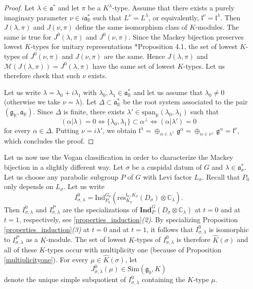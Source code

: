\documentclass{amsart}
\theoremstyle{definition}
\begin{document}
\begin{proof}
    Let $\lambda \in \mathfrak{a}^*$ and let $\pi$ be a $K^\lambda$-type. Assume that there exists a purely imaginary parameter $\nu \in i\mathfrak{a}^*_\mathbb{R}$ such that $L^\nu = L^\lambda$, or equivalently, $\mathfrak{l}^\nu = \mathfrak{l}^\lambda$. Then $J(\lambda,\pi)$ and $J(\nu, \pi)$ define the same isomorphism class of $K$-modules. The same is true for $J^0(\lambda,\pi)$ and $J^0(\nu, \pi)$.
    Since the Mackey bijection preserves lowest $K$-types for unitary representations \cite{Afgoustidis1}*{Proposition 4.1}, the set of lowest $K$-types of $J^0(\nu, \pi)$ and $J(\nu, \pi)$ are the same. Hence $J(\lambda,\pi)$ and $\mathcal{M}(J(\lambda,\pi)) = J^0(\lambda,\pi)$ have the same set of lowest $K$-types. Let us therefore check that such $\nu$ exists.
    
    Let us write $\lambda = \lambda_0 + i \lambda_1$ with $\lambda_0,\lambda_1 \in \mathfrak{a}_\mathbb{R}^*$ and let us assume that $\lambda_0 \neq 0$ (otherwise we take $\nu = \lambda$). Let $\Delta \subset \mathfrak{a}_\mathbb{R}^*$ be the root system associated to the pair $(\mathfrak{g}_\mathbb{R},\mathfrak{a}_\mathbb{R})$. Since $\Delta$ is finite, there exists $\lambda' \in \mathrm{span}_\mathbb{R}(\lambda_0,\lambda_1)$ such that
    \[(\alpha |\lambda) = 0 \Longleftrightarrow \{\lambda_0,\lambda_1\} \subset \alpha^\perp \Longleftrightarrow (\alpha | \lambda') = 0\]
    for every $\alpha \in \Delta$. Putting $\nu = i \lambda'$, we obtain
    \(\mathfrak{l}^\lambda = \oplus_{\alpha \in \lambda^\perp}\mathfrak{g}^\alpha = \oplus_{\alpha \in \nu^\perp}\mathfrak{g}^\alpha = \mathfrak{l}^\nu,\)
    which concludes the proof.
\end{proof}

Let us now use the Vogan classification in order to characterize the Mackey bijection in a slightly different way. Let $\sigma$ be a cuspidal datum of $G$ and $\lambda \in \mathfrak{a}^*_\sigma$. Let us choose any parabolic subgroup $P$ of $G$ with Levi factor $L_\sigma$. Recall that $P_0$ only depends on $L_\sigma$. Let us write
\begin{equation} \label{definition_I^0} I^0_{\sigma,\lambda} = \mathrm{Ind}_{P_0}^{G_0}\left(\mathrm{res}_{K_\sigma}^{\mathfrak{l}_\sigma,K_\sigma}(D_\sigma) \otimes \mathbb{C}_\lambda\right).\end{equation}
Then $I^0_{\sigma,\lambda}$ and $I^P_{\sigma,\lambda}$ are the specializations of $\mathbf{Ind}_P^G(D_\sigma \otimes \mathbb{C}_\lambda)$ at $t=0$ and at $t= 1$, respectively, see \ref{properties_induction}\textit{(2)}. By specializing Proposition \ref{properties_induction}\textit{(3)} at $t=0$ and at $t= 1$, it follows that $I^0_{\sigma,\lambda}$ is isomorphic to $I^{P}_{\sigma,\lambda}$ as a $K$-module. The set of lowest $K$-types of $I^0_{\sigma,\lambda}$ is therefore $\widehat{K}(\sigma)$ and all of these $K$-types occur with multiplicity one (because of Proposition \ref{multiplicityone}). For every $\mu \in \widehat{K}(\sigma)$, let
\begin{equation*}
    J^0_{\sigma,\lambda}(\mu) \in \mathrm{Sim}(\mathfrak{g}_0,K)
\end{equation*}
denote the unique simple subquotient of $I^0_{\sigma,\lambda}$ containing the $K$-type $\mu$.
\end{document}
